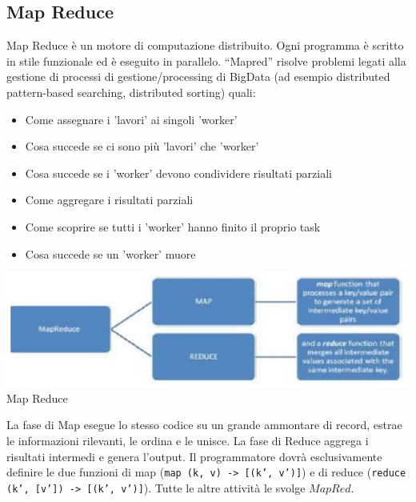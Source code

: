 \documentclass[a4page, 11pt]{article}
\begin{document}
\subsection{Map Reduce}
Map Reduce è un motore di computazione distribuito. Ogni programma è scritto in stile funzionale ed è eseguito in parallelo. “Mapred” risolve problemi legati alla gestione di processi di gestione/processing di BigData (ad esempio distributed pattern-based searching, distributed sorting) quali:
\begin{itemize}[noitemsep]
\item Come assegnare i 'lavori' ai singoli 'worker'
\item Cosa succede se ci sono più 'lavori' che 'worker'
\item Cosa succede se i 'worker' devono condividere risultati parziali
\item Come aggregare i risultati parziali
\item Come scoprire se tutti i 'worker' hanno finito il proprio task
\item Cosa succede se un 'worker' muore
\end{itemize}
\begin{center}
	\includegraphics[scale=1]{IMAGE8.png}\\
	Map Reduce
\end{center}
La fase di Map esegue lo stesso codice su un grande ammontare di record, estrae le informazioni rilevanti, le ordina e le unisce. La fase di Reduce aggrega i risultati intermedi e genera l’output. Il programmatore dovrà esclusivamente definire le due funzioni di map (\texttt{map (k, v) -> [(k’, v’)]}) e di reduce (\texttt{reduce (k’, [v’]) -> [(k’, v’)]}). Tutte le altre attività le svolge  $MapRed$.
\end{document}
